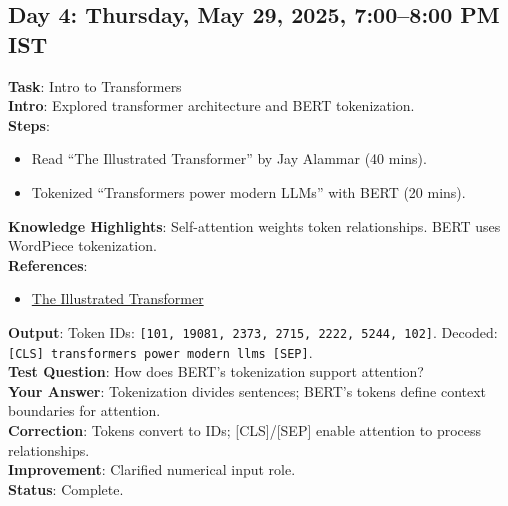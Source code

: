 \documentclass[a4paper,12pt]{article}
\begin{document}
\subsection*{Day 4: Thursday, May 29, 2025, 7:00--8:00 PM IST}
\textbf{Task}: Intro to Transformers \\
\textbf{Intro}: Explored transformer architecture and BERT tokenization. \\
\textbf{Steps}:
\begin{itemize}
    \item Read ``The Illustrated Transformer'' by Jay Alammar (40 mins).
    \item Tokenized ``Transformers power modern LLMs'' with BERT (20 mins).
\end{itemize}
\textbf{Knowledge Highlights}: Self-attention weights token relationships. BERT uses WordPiece tokenization. \\
\textbf{References}: 
\begin{itemize}
    \item \href{https://jalammar.github.io/illustrated-transformer}{The Illustrated Transformer}
\end{itemize}
\textbf{Output}: Token IDs: \texttt{[101, 19081, 2373, 2715, 2222, 5244, 102]}. Decoded: \texttt{[CLS] transformers power modern llms [SEP]}. \\
\textbf{Test Question}: How does BERT’s tokenization support attention? \\
\textbf{Your Answer}: Tokenization divides sentences; BERT’s tokens define context boundaries for attention. \\
\textbf{Correction}: Tokens convert to IDs; [CLS]/[SEP] enable attention to process relationships. \\
\textbf{Improvement}: Clarified numerical input role. \\
\textbf{Status}: Complete.

\end{document}
